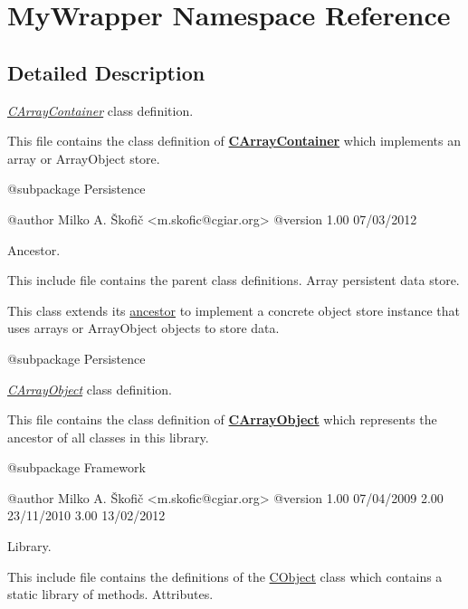 \hypertarget{namespace_my_wrapper}{\section{My\-Wrapper Namespace Reference}
\label{namespace_my_wrapper}
}


\subsection{Detailed Description}
{\itshape \hyperlink{class_c_array_container}{C\-Array\-Container}} class definition.

This file contains the class definition of {\bfseries \hyperlink{class_c_array_container}{C\-Array\-Container}} which implements an array or Array\-Object store.

\begin{DoxyVerb}    @subpackage     Persistence

    @author         Milko A. Škofič <m.skofic@cgiar.org>
    @version        1.00 07/03/2012\end{DoxyVerb}


Ancestor.

This include file contains the parent class definitions. Array persistent data store.

This class extends its \hyperlink{class_c_container}{ancestor} to implement a concrete object store instance that uses arrays or Array\-Object objects to store data.

\begin{DoxyVerb}    @subpackage     Persistence\end{DoxyVerb}


{\itshape \hyperlink{class_c_array_object}{C\-Array\-Object}} class definition.

This file contains the class definition of {\bfseries \hyperlink{class_c_array_object}{C\-Array\-Object}} which represents the ancestor of all classes in this library.

\begin{DoxyVerb}    @subpackage     Framework

    @author         Milko A. Škofič <m.skofic@cgiar.org>
    @version        1.00 07/04/2009
                            2.00 23/11/2010
                            3.00 13/02/2012\end{DoxyVerb}


Library.

This include file contains the definitions of the \hyperlink{class_c_object}{C\-Object} class which contains a static library of methods. Attributes.

